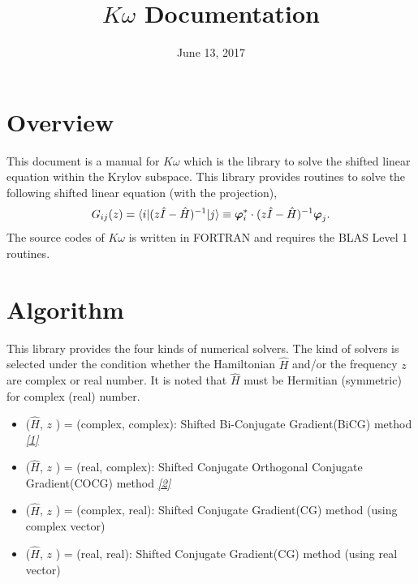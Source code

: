 \documentclass[letterpaper,10pt,dvipdfmx,openany]{sphinxmanual}
\title{$K\omega$ Documentation}
\date{June 13, 2017}
\author{}
\begin{document}
\maketitle
\tableofcontents
{}\label{index::doc}



\chapter{Overview}
\label{komega_overview_en:overview}\label{komega_overview_en::doc}\label{komega_overview_en:welcome-to-s-documentation}
This document is a manual for \(K\omega\) which is the library to
solve the shifted linear equation within the Krylov subspace.
This library provides routines to solve the following shifted linear equation
(with the projection),
\label{komega_overview_en:shiftedeq}\begin{gather}
\begin{split}\begin{align}
  G_{i j}(z) = \langle i | (z {\hat I} -{\hat H})^{-1}| j \rangle \equiv
  {\boldsymbol \varphi}_i^{*} \cdot (z{\hat I}-{\hat H})^{-1} {\boldsymbol \varphi}_j.
  \end{align}\end{split}\notag
\end{gather}
The source codes of \(K\omega\) is written in FORTRAN
and requires the BLAS Level 1 routines.


\chapter{Algorithm}
\label{komega_algorithm_en::doc}\label{komega_algorithm_en:algorithm}
This library provides the four kinds of numerical solvers.
The kind of solvers is selected under the condition whether the Hamiltonian
\({\hat H}\) and/or the frequency \(z\) are complex or real number.
It is noted that \({\hat H}\) must be Hermitian (symmetric)
for complex (real) number.
\begin{itemize}
\item {} 
(\({\hat H}\), \(z\) ) = (complex, complex):
Shifted Bi-Conjugate Gradient(BiCG) method {\hyperref[komega_ref_en:ref]{\emph{{[}1{]}}}}

\item {} 
(\({\hat H}\), \(z\) ) = (real, complex):
Shifted Conjugate Orthogonal Conjugate Gradient(COCG) method {\hyperref[komega_ref_en:ref]{\emph{{[}2{]}}}}

\item {} 
(\({\hat H}\), \(z\) ) = (complex, real):
Shifted Conjugate Gradient(CG) method (using complex vector)

\item {} 
(\({\hat H}\), \(z\) ) = (real, real):
Shifted Conjugate Gradient(CG) method (using real vector)

\end{itemize}
\end{document}
